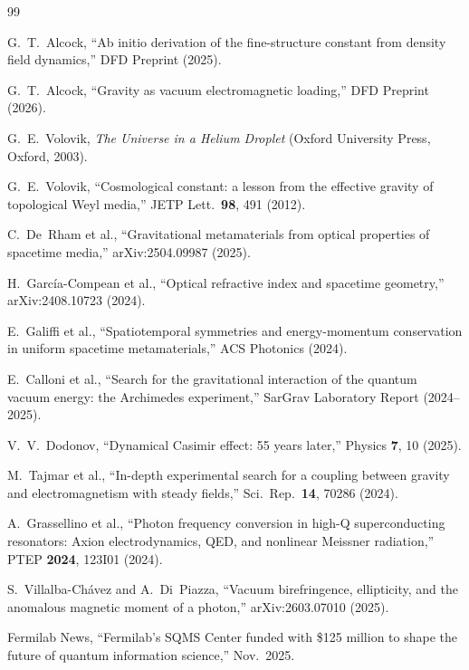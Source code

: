 \documentclass[aps,prd,twocolumn,superscriptaddress,nofootinbib]{revtex4-2}
\begin{document}
\begin{thebibliography}{99}

G.~T.~Alcock,
``Ab initio derivation of the fine-structure constant from density
field dynamics,''
DFD Preprint (2025).

G.~T.~Alcock,
``Gravity as vacuum electromagnetic loading,''
DFD Preprint (2026).

G.~E.~Volovik,
\emph{The Universe in a Helium Droplet}
(Oxford University Press, Oxford, 2003).

G.~E.~Volovik,
``Cosmological constant: a lesson from the effective gravity of
topological Weyl media,''
JETP Lett.\ \textbf{98}, 491 (2012).

C.~De~Rham et al.,
``Gravitational metamaterials from optical properties of spacetime
media,''
arXiv:2504.09987 (2025).

H.~Garc\'{i}a-Compean et al.,
``Optical refractive index and spacetime geometry,''
arXiv:2408.10723 (2024).

E.~Galiffi et al.,
``Spatiotemporal symmetries and energy-momentum conservation in
uniform spacetime metamaterials,''
ACS Photonics (2024).

E.~Calloni et al.,
``Search for the gravitational interaction of the quantum vacuum
energy: the Archimedes experiment,''
SarGrav Laboratory Report (2024--2025).

V.~V.~Dodonov,
``Dynamical Casimir effect: 55 years later,''
Physics \textbf{7}, 10 (2025).

M.~Tajmar et al.,
``In-depth experimental search for a coupling between gravity and
electromagnetism with steady fields,''
Sci.\ Rep.\ \textbf{14}, 70286 (2024).

A.~Grassellino et al.,
``Photon frequency conversion in high-Q superconducting resonators:
Axion electrodynamics, QED, and nonlinear Meissner radiation,''
PTEP \textbf{2024}, 123I01 (2024).

S.~Villalba-Ch\'{a}vez and A.~Di~Piazza,
``Vacuum birefringence, ellipticity, and the anomalous magnetic
moment of a photon,''
arXiv:2603.07010 (2025).

Fermilab News,
``Fermilab's SQMS Center funded with \$125 million to shape the
future of quantum information science,''
Nov.\ 2025.


\end{thebibliography}
\end{document}
